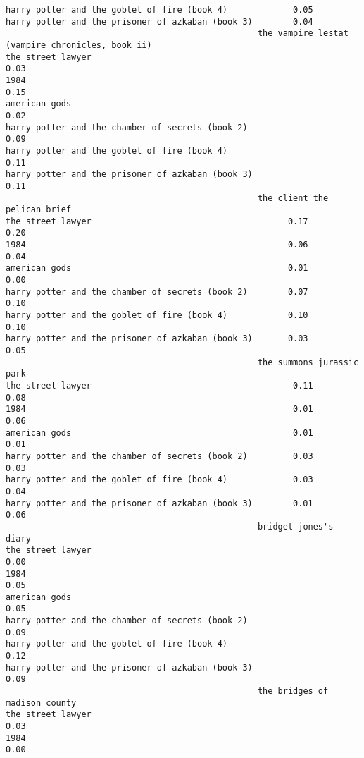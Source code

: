 \documentclass[
]{report}
\begin{document}
\begin{verbatim}
harry potter and the goblet of fire (book 4)             0.05
harry potter and the prisoner of azkaban (book 3)        0.04
                                                  the vampire lestat (vampire chronicles, book ii)
the street lawyer                                                                             0.03
1984                                                                                          0.15
american gods                                                                                 0.02
harry potter and the chamber of secrets (book 2)                                              0.09
harry potter and the goblet of fire (book 4)                                                  0.11
harry potter and the prisoner of azkaban (book 3)                                             0.11
                                                  the client the pelican brief
the street lawyer                                       0.17              0.20
1984                                                    0.06              0.04
american gods                                           0.01              0.00
harry potter and the chamber of secrets (book 2)        0.07              0.10
harry potter and the goblet of fire (book 4)            0.10              0.10
harry potter and the prisoner of azkaban (book 3)       0.03              0.05
                                                  the summons jurassic park
the street lawyer                                        0.11          0.08
1984                                                     0.01          0.06
american gods                                            0.01          0.01
harry potter and the chamber of secrets (book 2)         0.03          0.03
harry potter and the goblet of fire (book 4)             0.03          0.04
harry potter and the prisoner of azkaban (book 3)        0.01          0.06
                                                  bridget jones's diary
the street lawyer                                                  0.00
1984                                                               0.05
american gods                                                      0.05
harry potter and the chamber of secrets (book 2)                   0.09
harry potter and the goblet of fire (book 4)                       0.12
harry potter and the prisoner of azkaban (book 3)                  0.09
                                                  the bridges of madison county
the street lawyer                                                          0.03
1984                                                                       0.00

\end{verbatim}
\end{document}
